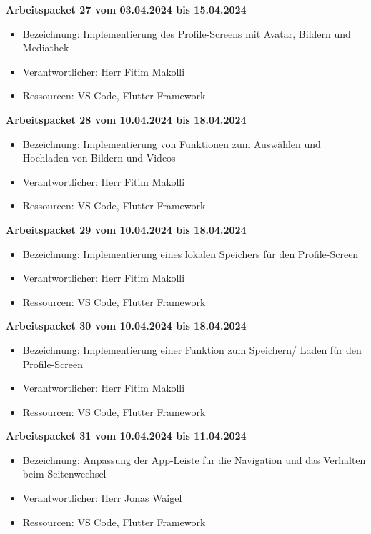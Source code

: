 \textbf{Arbeitspacket 27 vom 03.04.2024 bis 15.04.2024}
\begin{itemize}[itemsep=0pt]
	\item{Bezeichnung: Implementierung des Profile-Screens mit Avatar, Bildern und Mediathek}
	\item{Verantwortlicher: Herr Fitim Makolli} 
	\item{Ressourcen: VS Code, Flutter Framework} 
\end{itemize}

\textbf{Arbeitspacket 28 vom 10.04.2024 bis 18.04.2024}
\begin{itemize}[itemsep=0pt]
	\item{Bezeichnung: Implementierung von Funktionen zum Auswählen und Hochladen von Bildern und Videos}
	\item{Verantwortlicher: Herr Fitim Makolli} 
	\item{Ressourcen: VS Code, Flutter Framework} 
\end{itemize} 

\textbf{Arbeitspacket 29 vom 10.04.2024 bis 18.04.2024}
\begin{itemize}[itemsep=0pt]
	\item{Bezeichnung: Implementierung eines lokalen Speichers für den Profile-Screen}
	\item{Verantwortlicher: Herr Fitim Makolli} 
	\item{Ressourcen: VS Code, Flutter Framework} 
\end{itemize}

\textbf{Arbeitspacket 30 vom 10.04.2024 bis 18.04.2024}
\begin{itemize}[itemsep=0pt]
	\item{Bezeichnung: Implementierung einer Funktion zum Speichern/ Laden für den Profile-Screen}
	\item{Verantwortlicher: Herr Fitim Makolli} 
	\item{Ressourcen: VS Code, Flutter Framework} 
\end{itemize}

\textbf{Arbeitspacket 31 vom 10.04.2024 bis 11.04.2024}
\begin{itemize}[itemsep=0pt]
	\item{Bezeichnung: Anpassung der App-Leiste für die Navigation und das Verhalten beim Seitenwechsel}
	\item{Verantwortlicher: Herr Jonas Waigel} 
	\item{Ressourcen: VS Code, Flutter Framework} 
\end{itemize} 

